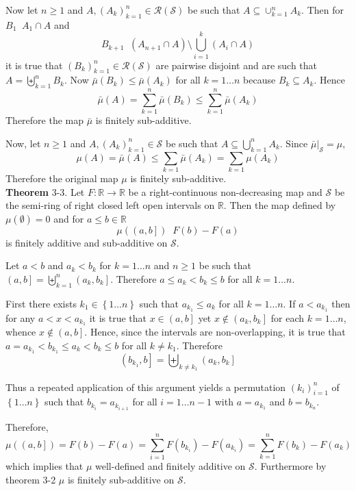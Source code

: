 \documentclass[a4paper]{article}
\newcommand{\obj}[1]{\left\{ #1 \right \}}
\newcommand{\ploc}[1]{\left ( #1 \right ]}
\newcommand{\brac}[1]{\left ( #1 \right )}
\newcommand{\induc}[1]{\left . #1 \right \vert}
\newcommand{\Real}{\mathbb{R}}
\newcommand{\Scal}{\mathcal{S}}
\newcommand{\Ring}[1]{\mathcal{R}\brac{#1}}
\newcommand{\defn}{\mathop{\overset{\Delta}{=}}\nolimits}
\begin{document}
Now let $n\geq1$ and $A, \brac{A_k}_{k=1}^n\in \Ring{\Scal}$ be such that $A\subseteq \cup_{k=1}^n A_k$. Then for $B_1\defn A_1\cap A$ and \[B_{k+1}\defn \brac{A_{n+1}\cap A}\setminus \bigcup_{i=1}^k \brac{A_i\cap A}\] it is true that $\brac{B_k}_{k=1}^n\in \Ring{\Scal}$ are pairwise disjoint and are such that $A=\biguplus_{k=1}^n B_k$. Now $\bar{\mu}\brac{B_k}\leq\bar{\mu}\brac{A_k}$ for all $k=1\ldots n$ because $B_k\subseteq A_k$. Hence \[\bar{\mu}\brac{A} = \sum_{k=1}^n \bar{\mu}\brac{B_k}\leq \sum_{k=1}^n \bar{\mu}\brac{A_k}\] Therefore the map $\bar{\mu}$ is finitely sub-additive.

Now, let $n\geq1$ and $A, \brac{A_k}_{k=1}^n\in \Scal$ be such that $A\subseteq \bigcup_{k=1}^n A_k$. Since $\induc{\bar{\mu}}_{\Scal} = \mu$, \[\mu\brac{A}=\bar{\mu}\brac{A}\leq \sum_{k=1}\bar{\mu}\brac{A_k} = \sum_{k=1}\mu\brac{A_k}\] Therefore the original map $\mu$ is finitely sub-additive.\\

\label{thm:stieltjes_meas_const1} \noindent \textbf{Theorem} 3-3.
Let $F:\Real\to\Real$ be a right-continuous non-decreasing map and $\Scal$ be the semi-ring of right closed left open intervals on $\Real$. Then the map defined by $\mu\brac{\emptyset}=0$ and for $a\leq b\in \Real$ \[\mu\brac{\ploc{a,b}}\defn F\brac{b}-F\brac{a}\] is finitely additive and sub-additive on $\Scal$.

Let $a<b$ and $a_k<b_k$ for $k=1\ldots n$ and $n\geq1$ be such that $\ploc{a,b}=\biguplus_{k=1}^n \ploc{a_k,b_k}$. Therefore $a\leq a_k<b_k\leq b$ for all $k=1\ldots n$.

First there exists $k_1\in \obj{1\ldots n}$ such that $a_{k_1}\leq a_k$ for all $k=1\ldots n$. If $a<a_{k_1}$ then for any $a<x<a_{k_1}$ it is true that $x\in \ploc{a,b}$ yet $x\notin \ploc{a_k,b_k}$ for each $k=1\ldots n$, whence $x\notin \ploc{a,b}$. Hence, since the intervals are non-overlapping, it is true that $a=a_{k_1}<b_{k_1}\leq a_k<b_k\leq b$ for all $k\neq k_1$. Therefore \[\ploc{b_{k_1},b}=\biguplus_{k\neq k_1} \ploc{a_k,b_k}\]

Thus a repeated application of this argument yields a permutation $\brac{k_i}_{i=1}^n$ of $\obj{1\ldots n}$ such that $b_{k_i}=a_{k_{i+1}}$ for all $i=1\ldots {n-1}$ with $a=a_{k_1}$ and $b=b_{k_n}$.

Therefore, \[\mu\brac{\ploc{a,b}} = F\brac{b}-F\brac{a} = \sum_{i=1}^n F\brac{b_{k_i}} - F\brac{a_{k_i}} = \sum_{k=1}^n F\brac{b_k}-F\brac{a_k}\] which implies that $\mu$ well-defined and finitely additive on $\Scal$. Furthermore by theorem 3-2 $\mu$ is finitely sub-additive on $\Scal$.\\
\end{document}
